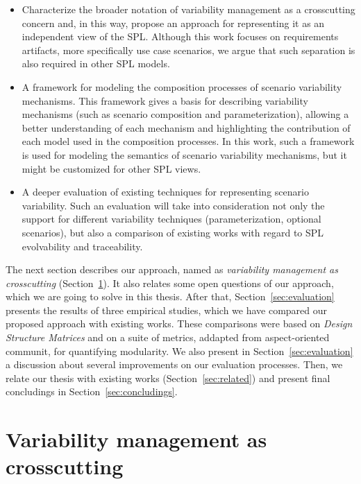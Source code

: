 \documentclass[times, 11pt,twocolumn]{article}
\begin{document}
\begin{itemize}
 \item Characterize the broader notation of variability management as
a crosscutting concern and, in this way, propose an approach for
representing it as an independent view of the SPL. Although
this work focuses on requirements artifacts, more specifically
use case scenarios, we argue that such separation is also required
in other SPL models.
 \item A framework for modeling the composition processes of scenario
variability mechanisms. This framework gives a basis for
describing variability mechanisms (such as scenario composition
and parameterization), allowing a better understanding of each mechanism and
highlighting the contribution of each model used in the composition processes.
In this work, such a framework is used for modeling the semantics of scenario variability mechanisms, but it
might be customized for other SPL views.
 \item A deeper evaluation of existing techniques for representing scenario
 variability. Such an evaluation will take into consideration not only the
 support for different variability techniques (parameterization, optional
 scenarios), but also a comparison of existing works with regard to
 SPL evolvability and traceability.  
\end{itemize}

The next section describes our approach, named as \emph{variability management
as crosscutting} (Section~\ref{sec:vmcc}). It also relates some open questions
of our approach, which we are going to solve in this thesis. After that,
Section~\ref{sec:evaluation} presents the results of three empirical studies,
which we have compared our proposed approach with existing
works. These comparisons were based on \emph{Design Structure Matrices} and on a
suite of metrics, addapted from aspect-oriented communit, for quantifying modularity.
We also present in Section~\ref{sec:evaluation} a discussion about several
improvements on our evaluation processes. Then, we relate our
thesis with existing works (Section~\ref{sec:related}) and present final concludings 
in Section~\ref{sec:concludings}.

\section{Variability management as crosscutting}\label{sec:vmcc}
\end{document}
